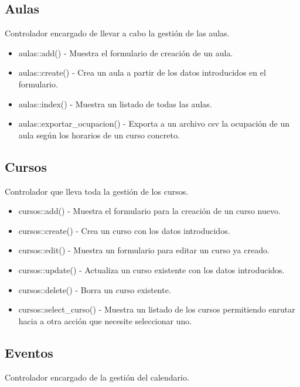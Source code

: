 \subsection{Aulas}
Controlador encargado de llevar a cabo la gestión de las aulas.

\begin{itemize}
\item aulas::add() - Muestra el formulario de creación de un aula.
\item aulas::create() - Crea un aula a partir de los datos introducidos en el formulario.
\item aulas::index() - Muestra un listado de todas las aulas.
\item aulas::exportar\_ocupacion() - Exporta a un archivo csv la ocupación de un aula según los horarios de un curso concreto.
\end{itemize}

\subsection{Cursos}

Controlador que lleva toda la gestión de los cursos.

\begin{itemize}
\item cursos::add() - Muestra el formulario para la creación de un curso nuevo.
\item cursos::create() - Crea un curso con los datos introducidos.
\item cursos::edit() - Muestra un formulario para editar un curso ya creado.
\item cursos::update() - Actualiza un curso existente con los datos introducidos.
\item cursos::delete() - Borra un curso existente.
\item cursos::select\_curso() - Muestra un listado de los cursos permitiendo enrutar hacia a otra acción que necesite seleccionar uno.
\end{itemize}

\subsection{Eventos}

Controlador encargado de la gestión del calendario.

